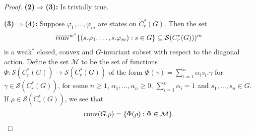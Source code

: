 \begin{theorem}
\begin{proof}
\noindent \textbf{(2)$\Rightarrow$(3):} Is trivially true.

\noindent \textbf{(3)$\Rightarrow$(4):} Suppose $\varphi_{1}, \dots, \varphi_{m}$ are states on $C_r^*(G)$. Then the set 
\begin{align*}
\overline{\operatorname{conv}}^{w^*}\{(s. \varphi_1,\dots, s. \varphi_m) : s \in G \}\subseteq \mathcal{S}(C_r^*(G)))^m
\end{align*} 
is a weak$^*$ closed, convex and $G$-invariant subset with respect to the diagonal action. Define the set $\mathcal{M}$ to be the set of functions $\Phi \colon \mathcal{S}(C_r^*(G)) \to \mathcal{S}(C_r^*(G))$ of the form $\Phi(\gamma)= \sum_{i =1}^n \alpha_i s_i.\gamma$ for $\gamma \in \mathcal{S}(C_r^*(G))$, for some $n \geq 1$, $\alpha_{1},\dots, \alpha_n \geq 0$, $\sum_{i =1}^n \alpha_i=1$ and $s_1,\dots,s_n \in G$. If $\rho \in \mathcal{S}(C_r^*(G))$, we see that 
\begin{align*}
\operatorname{conv} (G.\rho)= \{ \Phi(\rho) : \Phi \in \mathcal{M} \}.
\end{align*}


\end{proof}
\end{theorem}

